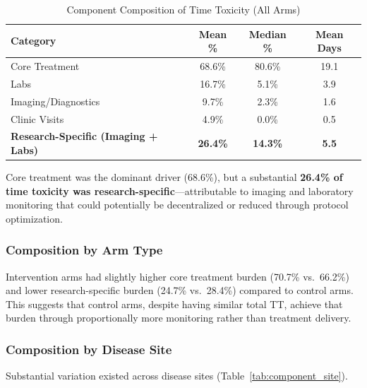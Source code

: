 \documentclass[11pt,a4paper]{article}
\begin{document}
\begin{table}[H]
\centering
\caption{Component Composition of Time Toxicity (All Arms)}
\label{tab:components}
\begin{tabular}{lccc}
\toprule
\textbf{Category} & \textbf{Mean \%} & \textbf{Median \%} & \textbf{Mean Days} \\
\midrule
Core Treatment & 68.6\% & 80.6\% & 19.1 \\
Labs & 16.7\% & 5.1\% & 3.9 \\
Imaging/Diagnostics & 9.7\% & 2.3\% & 1.6 \\
Clinic Visits & 4.9\% & 0.0\% & 0.5 \\
\midrule
\textbf{Research-Specific (Imaging + Labs)} & \textbf{26.4\%} & \textbf{14.3\%} & \textbf{5.5} \\
\bottomrule
\end{tabular}
\end{table}

Core treatment was the dominant driver (68.6\%), but a substantial \textbf{26.4\% of time toxicity was research-specific}---attributable to imaging and laboratory monitoring that could potentially be decentralized or reduced through protocol optimization.

\subsubsection{Composition by Arm Type}

Intervention arms had slightly higher core treatment burden (70.7\% vs.\ 66.2\%) and lower research-specific burden (24.7\% vs.\ 28.4\%) compared to control arms. This suggests that control arms, despite having similar total TT, achieve that burden through proportionally more monitoring rather than treatment delivery.

\subsubsection{Composition by Disease Site}

Substantial variation existed across disease sites (Table~\ref{tab:component_site}).
\end{document}
